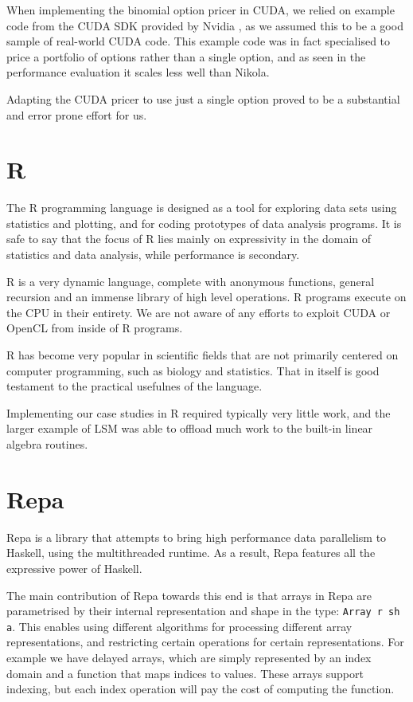 When implementing the binomial option pricer in CUDA, we relied on example code
from the CUDA SDK provided by Nvidia \cite{CUDAbinomial}, as we assumed this to
be a good sample of real-world CUDA code. This example code was in fact
specialised to price a portfolio of options rather than a single option, and as
seen in the performance evaluation it scales less well than Nikola.

Adapting the CUDA pricer to use just a single option proved to be a substantial
and error prone effort for us.

\section{R}

The R programming language is designed as a tool for exploring data sets using
statistics and plotting, and for coding prototypes of data analysis programs.
It is safe to say that the focus of R lies mainly on expressivity in the domain
of statistics and data analysis, while performance is secondary.

R is a very dynamic language, complete with anonymous functions, general
recursion and an immense library of high level operations. R programs execute
on the CPU in their entirety. We are not aware of any efforts to exploit CUDA
or OpenCL from inside of R programs.

R has become very popular in scientific fields that are not primarily centered
on computer programming, such as biology and statistics\cite{}. That in itself
is good testament to the practical usefulnes of the language.

Implementing our case studies in R required typically very little work, and the
larger example of LSM was able to offload much work to the built-in linear
algebra routines.

\section{Repa}

Repa is a library that attempts to bring high performance data parallelism to
Haskell, using the multithreaded runtime. As a result, Repa features all the
expressive power of Haskell.

The main contribution of Repa towards this end is that arrays in Repa are
parametrised by their internal representation and shape in the type:
\texttt{Array r sh a}.  This enables using different algorithms for processing
different array representations, and restricting certain operations for certain
representations. For example we have delayed arrays, which are simply
represented by an index domain and a function that maps indices to values.
These arrays support indexing, but each index operation will pay the cost of
computing the function.


